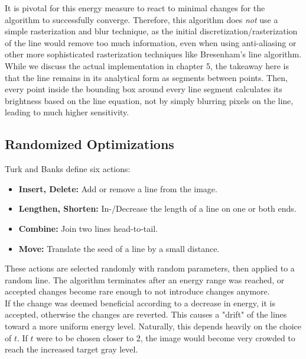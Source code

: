 It is pivotal for this energy measure to react to minimal changes for the algorithm to successfully converge.
Therefore, this algorithm does \textit{not} use a simple rasterization and blur technique, as the initial discretization/rasterization
of the line would remove too much information, even when using anti-aliasing or other more sophisticated rasterization techniques like Bresenham's line algorithm.
While we discuss the actual implementation in chapter 5, the takeaway here is that the line remains in its analytical form as segments between points.
Then, every point inside the bounding box around every line segment calculates its brightness
based on the line equation, not by simply blurring pixels on the line, leading to much higher sensitivity.

\subsection{Randomized Optimizations}
Turk and Banks define six actions:
\begin{itemize}
    \item \textbf{Insert, Delete:} Add or remove a line from the image.
    \item \textbf{Lengthen, Shorten:} In-/Decrease the length of a line on one or both ends.
    \item \textbf{Combine:} Join two lines head-to-tail.
    \item \textbf{Move:} Translate the seed of a line by a small distance.
\end{itemize}
These actions are selected randomly with random parameters, then applied to a random line.
The algorithm terminates after an energy range was reached, or accepted changes become rare enough to not introduce changes anymore.\\
If the change was deemed beneficial according to a decrease in energy, it is accepted, otherwise the changes are reverted.
This causes a "drift" of the lines toward a more uniform energy level.
Naturally, this depends heavily on the choice of $t$. If $t$ were to be chosen closer to 2,
the image would become very crowded to reach the increased target gray level.
\newpage